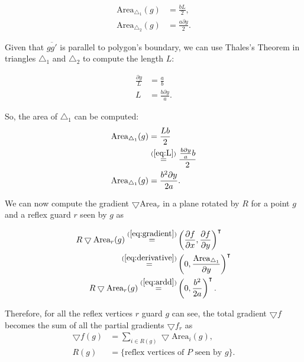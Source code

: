 \begin{align*}
    \text{Area}_{\triangle_1}(g) &= \frac{b L}{2},\\ 
    \text{Area}_{\triangle_2}(g) &= \frac{a \partial y}{2}.
\end{align*}


Given that $\overline{gg'}$ is parallel to polygon's boundary, we can use Thales's Theorem in triangles $\triangle_1$ and $\triangle_2$ to compute the length $L$: 

\begin{align}
    \frac{\partial y}{L} &= \frac a b \nonumber \\ 
    L &= \frac{b \partial y}{a}. \label{eq:L}
\end{align}

So, the area of $\triangle_1$ can be computed:
\begin{align}
    \text{Area}_{\triangle_1}(g) &= \frac{Lb}{2} \nonumber \\ 
    &\overset{(\ref{eq:L})}{=} \frac{\frac{b \partial y}{a}b}{2} \nonumber \\ 
    \text{Area}_{\triangle_1}(g) &= \frac{b^2 \partial y}{2a}. \label{eq:ardd}
\end{align}

We can now compute the gradient $\bigtriangledown \text{Area}_r$ in a plane rotated by $R$ for a point $g$ and a reflex guard $r$ seen by $g$ as

\begin{align}
    R\bigtriangledown \text{Area}_r(g) \overset{(\ref{eq:gradient})}{=} &\left(\frac{\partial f}{\partial x}, \frac{\partial f}{\partial y}\right)^\intercal \nonumber \\
    \overset{(\ref{eq:derivative})}{=} &\left(0, \frac{\text{Area}_{\triangle_1}}{\partial y}\right)^\intercal \nonumber \\
    R\bigtriangledown \text{Area}_r(g) \overset{(\ref{eq:ardd})}{=} &\left(0, \frac{b^2}{2a}\right)^\intercal. \label{eq:normf1}
\end{align}


Therefore, for all the reflex vertices $r$ guard $g$ can see, the total gradient $\bigtriangledown f$ becomes the sum of all the partial gradients $\bigtriangledown f_r$ as 
\begin{align}
    \bigtriangledown f(g) &= \sum_{i \in R(g)} \bigtriangledown \text{Area}_i(g), \label{eq:normf2} \\ 
    R(g) &= \{\text{reflex vertices of } P \text{ seen by }g\}. \nonumber
\end{align}

